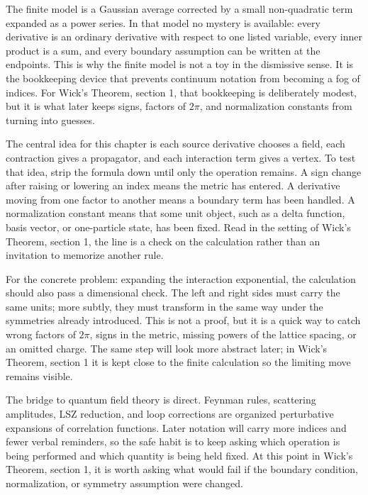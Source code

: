 The finite model is a Gaussian average corrected by a small non-quadratic term expanded as a power series.  In that model no mystery is available: every derivative is an ordinary derivative with respect to one listed variable, every inner product is a sum, and every boundary assumption can be written at the endpoints.  This is why the finite model is not a toy in the dismissive sense.  It is the bookkeeping device that prevents continuum notation from becoming a fog of indices.  For Wick's Theorem, section 1, that bookkeeping is deliberately modest, but it is what later keeps signs, factors of \(2\pi\), and normalization constants from turning into guesses.

The central idea for this chapter is each source derivative chooses a field, each contraction gives a propagator, and each interaction term gives a vertex.  To test that idea, strip the formula down until only the operation remains.  A sign change after raising or lowering an index means the metric has entered.  A derivative moving from one factor to another means a boundary term has been handled.  A normalization constant means that some unit object, such as a delta function, basis vector, or one-particle state, has been fixed.  Read in the setting of Wick's Theorem, section 1, the line is a check on the calculation rather than an invitation to memorize another rule.

For the concrete problem: expanding the interaction exponential, the calculation should also pass a dimensional check.  The left and right sides must carry the same units; more subtly, they must transform in the same way under the symmetries already introduced.  This is not a proof, but it is a quick way to catch wrong factors of \(2\pi\), signs in the metric, missing powers of the lattice spacing, or an omitted charge.  The same step will look more abstract later; in Wick's Theorem, section 1 it is kept close to the finite calculation so the limiting move remains visible.

The bridge to quantum field theory is direct.  Feynman rules, scattering amplitudes, LSZ reduction, and loop corrections are organized perturbative expansions of correlation functions.  Later notation will carry more indices and fewer verbal reminders, so the safe habit is to keep asking which operation is being performed and which quantity is being held fixed.  At this point in Wick's Theorem, section 1, it is worth asking what would fail if the boundary condition, normalization, or symmetry assumption were changed.

